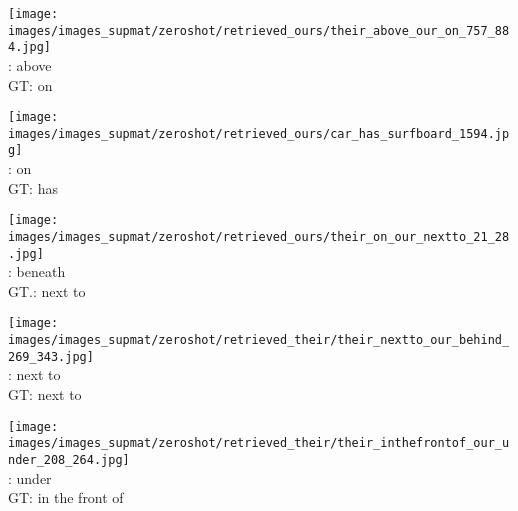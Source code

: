 \documentclass[10pt,twocolumn,letterpaper]{article}
\begin{document}
\begin{figure*}[t]
\begin{minipage}[t]{0.185\textwidth}
    	\centering
       	\texttt{[image: images/images\_supmat/zeroshot/retrieved\_ours/their\_above\_our\_on\_757\_884.jpg]}\\
       	\vspace{0.3ex}
       	\cite{Lu16}: above \\
       	GT: on
       	\vspace{2ex}
    \end{minipage}
    \hspace{0.005\textwidth}
\begin{minipage}[t]{0.185\textwidth}
    	\centering
       	\texttt{[image: images/images\_supmat/zeroshot/retrieved\_ours/car\_has\_surfboard\_1594.jpg]}\\
       	\vspace{0.3ex}
       	\cite{Lu16}: on \\
       	GT: has
       	\vspace{0.2ex}
    \end{minipage}
    \hspace{0.005\textwidth}
\begin{minipage}[t]{0.185\textwidth}
       \centering
       \texttt{[image: images/images\_supmat/zeroshot/retrieved\_ours/their\_on\_our\_nextto\_21\_28.jpg]}\\
       \vspace{0.3ex}
       \cite{Lu16}: beneath \\
       GT.: next to
       \vspace{0.2ex}
    \end{minipage}
    \hspace{0.005\textwidth}
\begin{minipage}[t]{0.185\textwidth}
    	\centering
       	\texttt{[image: images/images\_supmat/zeroshot/retrieved\_their/their\_nextto\_our\_behind\_269\_343.jpg]}\\
       	\vspace{0.3ex}
       	\cite{Lu16}: next to \\
       	GT: next to
       	\vspace{0.2ex}
    \end{minipage}
    \hspace{0.005\textwidth}  
\begin{minipage}[t]{0.185\textwidth}
    	\centering
       	\texttt{[image: images/images\_supmat/zeroshot/retrieved\_their/their\_inthefrontof\_our\_under\_208\_264.jpg]}\\
		\vspace{0.3ex}       	
       	\cite{Lu16}: under \\
       	GT: in the front of
      	\vspace{0.2ex}
    \end{minipage} 


\end{figure*}
\end{document}
